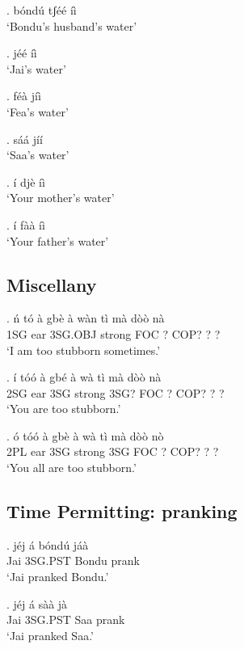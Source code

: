 \documentclass{assets/fieldnotes}
\begin{document}
\ex. bóndú tʃéé íì \\
`Bondu's husband's water' 


\ex. jéé íì \\
`Jai's water'


\ex. féà jíì \\
`Fea's water'


\ex. sáá jíí \\
`Saa's water'

\ex. í djè íì \\
`Your mother's water'

\ex. í fàà íì \\
`Your father's water'

\subsection{Miscellany}

\exg. ń tó à gbè à wàn tì mà dòò nà \\
1SG ear 3SG.OBJ strong FOC ? COP? ? ? \\
`I am too stubborn sometimes.'

\jmt{[o] + [i]}

\exg. í tóó à gbé à wà tì mà dòò nà \\
2SG ear 3SG strong 3SG? FOC ? COP? ? ? \\
`You are too stubborn.'

\ex. ó tóó à gbè à wà tì mà dòò nò \\
2PL ear 3SG strong 3SG FOC ? COP? ? ? \\
`You all are too stubborn.'

\subsection{Time Permitting: pranking}

\exg. jéj á bóndú jáà \\
Jai 3SG.PST Bondu prank \\
`Jai pranked Bondu.'

\exg. jéj á sàà jà \\
Jai 3SG.PST Saa prank \\
`Jai pranked Saa.'
\end{document}
